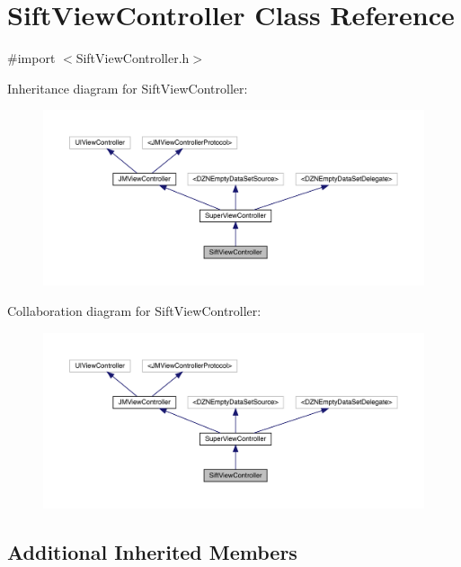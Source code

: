 \hypertarget{interface_sift_view_controller}{}\section{Sift\+View\+Controller Class Reference}
\label{interface_sift_view_controller}


{\ttfamily \#import $<$Sift\+View\+Controller.\+h$>$}



Inheritance diagram for Sift\+View\+Controller\+:\nopagebreak
\begin{figure}[H]
\begin{center}
\leavevmode
\includegraphics[width=350pt]{interface_sift_view_controller__inherit__graph}
\end{center}
\end{figure}


Collaboration diagram for Sift\+View\+Controller\+:\nopagebreak
\begin{figure}[H]
\begin{center}
\leavevmode
\includegraphics[width=350pt]{interface_sift_view_controller__coll__graph}
\end{center}
\end{figure}
\subsection*{Additional Inherited Members}


